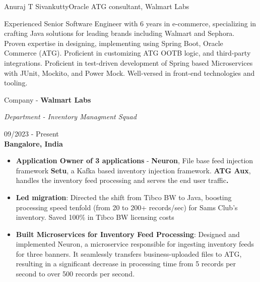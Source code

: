 \documentclass{article}
\begin{document}
\begin{cv}{Anuraj T Sivankutty}{Oracle ATG consultant, Walmart Labs}



Experienced Senior Software Engineer with 6 years in e-commerce, specializing in crafting Java solutions for leading brands including Walmart and Sephora. Proven expertise in designing, implementing using Spring Boot, Oracle Commerce (ATG). Proficient in customizing ATG OOTB logic, and third-party integrations. Proficient in test-driven development of Spring based Microservices with JUnit, Mockito, and Power Mock. Well-versed in front-end technologies and tooling.



\begin{cvevent}[Jan - 2020][present]


\begin{center}
  \begin{minipage}{0.6\textwidth}
    Company - \textbf{Walmart Labs}
    \vspace{0.1cm}
    
    \textit{Department - Inventory Managment Squad}
  \end{minipage}
  \hfill
  \begin{minipage}{0.35\textwidth}
    \small{09/2023 - Present} \\
    \textbf{Bangalore, India}
  \end{minipage}
\end{center}



    
    \begin{itemize}
        \item  \textbf{Application Owner of 3 applications }- \textbf{Neuron}, File base feed injection framework \textbf{Setu}, a Kafka based inventory injection framework. \textbf{ATG Aux}, handles the inventory feed processing and serves the end user traffic\textbf{.}

        \item \textbf{Led migration}: Directed the shift from Tibco BW to Java, boosting processing speed tenfold (from 20 to 200+ records/sec) for Sams Club's inventory. Saved 100\% in Tibco BW licensing costs 
        \item  \textbf{Built Microservices for Inventory Feed Processing}: Designed and implemented Neuron, a microservice responsible for ingesting inventory feeds for three banners. It seamlessly transfers business-uploaded files to ATG, resulting in a significant decrease in processing time from 5 records per second to over 500 records per second.


\end{itemize}
\end{cvevent}
\end{cv}
\end{document}
